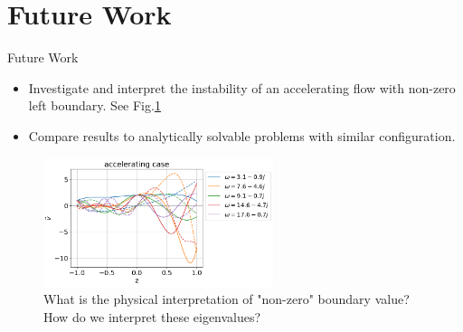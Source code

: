 \section{Future Work}
\begin{frame}{Future Work}
  \begin{itemize}
    \item Investigate and interpret the instability of an accelerating flow with non-zero left boundary. See Fig.\ref{fig:accelerating-v-nonzero-bc}
    \item Compare results to analytically solvable problems with similar configuration.
  \end{itemize}

  \begin{figure}[htbp]
    \centering
    \includegraphics[width=0.6\textwidth]{figures/numerical-experiments/accelerating-v-nonzero-bc}
    \caption{What is the physical interpretation of "non-zero" boundary value? How do we interpret these eigenvalues?}
    \label{fig:accelerating-v-nonzero-bc}
  \end{figure}
\end{frame}
